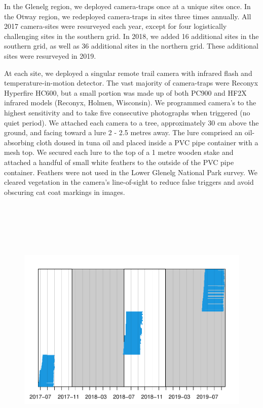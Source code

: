 \documentclass[11pt,a4paper,titlepage,twoside,openright]{style/unimelbthesis}
\begin{document}
\begin{mainmatter}
In the Glenelg region, we deployed camera-traps once at a unique sites once. In the Otway region, we redeployed camera-traps in sites three times annually. All 2017 camera-sites were resurveyed each year, except for four logistically challenging sites in the southern grid. In 2018, we added 16 additional sites in the southern grid, as well as 36 additional sites in the northern grid. These additional sites were resurveyed in 2019.

At each site, we deployed a singular remote trail camera with infrared flash and temperature-in-motion detector. The vast majority of camera-traps were Reconyx Hyperfire HC600, but a small portion was made up of both PC900 and HF2X infrared models (Reconyx, Holmen, Wisconsin). We programmed camera's to the highest sensitivity and to take five consecutive photographs when triggered (no quiet period). We attached each camera to a tree, approximately 30 cm above the ground, and facing toward a lure 2 - 2.5 metres away. The lure comprised an oil-absorbing cloth doused in tuna oil and placed inside a PVC pipe container with a mesh top. We secured each lure to the top of a 1 metre wooden stake and attached a handful of small white feathers to the outside of the PVC pipe container. Feathers were not used in the Lower Glenelg National Park survey. We cleared vegetation in the camera's line-of-sight to reduce false triggers and avoid obscuring cat coat markings in images.

\newpage

\(~\)

\(~\)

\(~\)
\begin{figure}

{\centering \includegraphics[width=1\linewidth]{figure/density-camop-1} 

}
\end{figure}
\end{mainmatter}
\end{document}
